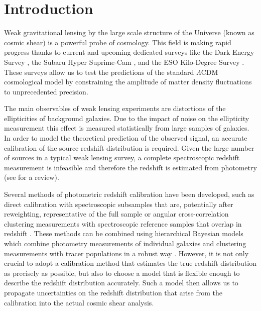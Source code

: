 \documentclass{aa}
\begin{document}
\section{Introduction}
Weak gravitational lensing by the large scale structure of the Universe (known as cosmic shear) is a powerful probe of cosmology. This field is making rapid progress thanks to current and upcoming dedicated surveys like the Dark Energy Survey \cite[DES; ][]{DES1, DES2, DES4, DES5}, the Subaru Hyper Suprime-Cam \cite[HSC; ][]{HSC1, HSC2} , and the ESO Kilo-Degree Survey \cite[KiDS; ][]{kuijken19, asgari20}. These surveys allow us to test the predictions of the standard $\Lambda$CDM cosmological model by constraining the amplitude of matter density fluctuations to unprecedented precision. 

The main observables of weak lensing experiments are distortions of the ellipticities of background galaxies. Due to the impact of noise on the ellipticity measurement this effect is measured statistically from large samples of galaxies. In order to model the theoretical prediction of the observed signal, an accurate calibration of the source redshift distribution is required. Given the large number of sources in a typical weak lensing survey, a complete spectroscopic redshift measurement is infeasible and therefore the redshift is estimated from photometry (see \cite{2019NatAs...3..212S} for a review). 

Several methods of photometric redshift calibration have been developed, such as direct calibration with spectroscopic subsamples that are, potentially after reweighting, representative of the full sample \citep{Lima, Bonnett, hildebrandt17} or angular cross-correlation clustering measurements with spectroscopic reference samples that overlap in redshift \cite[e.g. ][]{Newman08,MatthewsNewman, Menard}. These methods can be combined using hierarchical Bayesian models which combine photometry measurements of individual galaxies and clustering measurements with tracer populations in a robust way \citep{sanchez,alarcon}. However, it is not only crucial to adopt a calibration method that estimates the true redshift distribution as precisely as possible, but also to choose a model that is flexible enough to describe the redshift distribution accurately. Such a model then allows us to propagate uncertainties on the redshift distribution that arise from the calibration into the actual cosmic shear analysis. 
 
\end{document}
